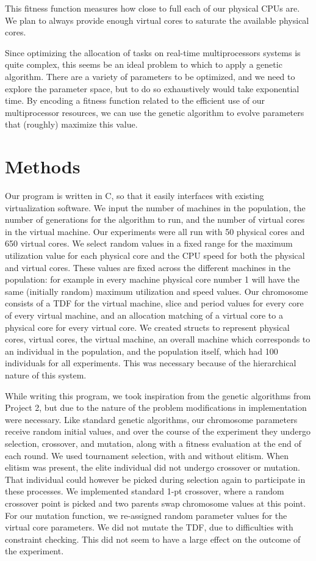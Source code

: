 \documentclass[11pt]{article}
\begin{document}
This fitness function measures how close to full each of our physical CPUs are. We plan to always provide enough virtual cores to saturate the available physical cores. 

Since optimizing the allocation of tasks on real-time multiprocessors systems is quite complex, this seems be an  ideal problem to which to apply a genetic algorithm. There are a variety of parameters to be optimized, and we need to explore the parameter space, but to do so exhaustively would take exponential time. By encoding a fitness function related to the efficient use of our multiprocessor resources, we can use the genetic algorithm to evolve parameters that (roughly) maximize this value.

\section{Methods}

Our program is written in C, so that it easily interfaces with existing virtualization software. We input the number of machines in the population, the number of generations for the algorithm to run, and the number of virtual cores in the virtual machine. Our experiments were all run with 50 physical cores and 650 virtual cores. We select random values in a fixed range for the maximum utilization value for each physical core and the CPU speed for both the physical and virtual cores. These values are fixed across the different machines in the population: for example in every machine physical core number 1 will have the same (initially random) maximum utilization and speed values. Our chromosome consists of a TDF for the virtual machine, slice and period values for every core of every virtual machine, and an allocation matching of a virtual core to a physical core for every virtual core. We created structs to represent physical cores, virtual cores, the virtual machine, an overall machine which corresponds to an individual in the population, and the population itself, which had 100 individuals for all experiments. This was necessary because of the hierarchical nature of this system. 

While writing this program, we took inspiration from the genetic algorithms from Project 2, but due to the nature of the problem modifications in implementation were necessary. Like standard genetic algorithms, our chromosome parameters receive random initial values, and over the course of the experiment they undergo selection, crossover, and mutation, along with a fitness evaluation at the end of each round. We used tournament selection, with and without elitism. When elitism was present, the elite individual did not undergo crossover or mutation. That individual could however be picked during selection again to participate in these processes. We implemented standard 1-pt crossover, where a random crossover point is picked and two parents swap chromosome values at this point. For our mutation function, we re-assigned random parameter values for the virtual core parameters. We did not mutate the TDF, due to difficulties with constraint checking. This did not seem to have a large effect on the outcome of the experiment. 
\end{document}
